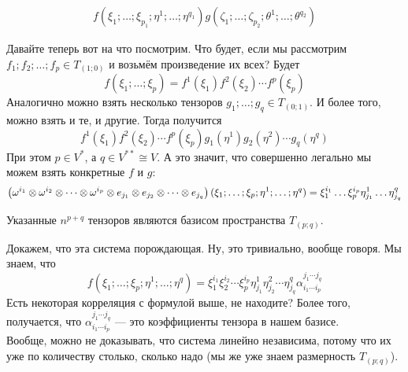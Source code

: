 \documentclass{article}
\begin{document}
\begin{itemize}
\begin{Comment}
\[\begin{split}
                f(\xi_1;\ldots;\xi_{p_1};\eta^1;\ldots;\eta^{q_1})g(\zeta_1;\ldots;\zeta_{p_2};\theta^1;\ldots;\theta^{q_2})
            \end{split}
            \]
        \end{Comment}
        \begin{Comment}
            Давайте теперь вот на что посмотрим. Что будет, если мы рассмотрим $f_1;f_2;\ldots;f_p\in T_{(1;0)}$ и возьмём произведение их всех? Будет
            $$
            f(\xi_1;\ldots;\xi_p)=f^1(\xi_1)f^2(\xi_2)\cdots f^p(\xi_p)
            $$
            Аналогично можно взять несколько тензоров $g_1;\ldots;g_q\in T_{(0;1)}$. И более того, можно взять и те, и другие. Тогда получится 
            $$
            f^1(\xi_1)f^2(\xi_2)\cdots f^p(\xi_p)g_1(\eta^1)g_2(\eta^2)\cdots g_q(\eta^q)
            $$
            При этом $p\in V^*$, а $q\in V^{**}\cong V$. А это значит, что совершенно легально мы можем взять конкретные $f$ и $g$:
            $$
            \left(\omega^{i_1}\otimes\omega^{i_2}\otimes\cdots\otimes\omega^{i_p}\otimes e_{j_1}\otimes e_{j_2}\otimes\cdots\otimes e_{j_q}\right)(\xi_1;\ldots;\xi_p;\eta^1;\ldots;\eta^q)=\\
            \xi_1^{i_1}\ldots\xi_p^{i_p}\eta^1_{j_1}\ldots\eta^q_{j_q}
            $$
        \end{Comment}
        \thm Указанные $n^{p+q}$ тензоров являются базисом пространства $T_{(p;q)}$.
        \begin{Proof}
            Докажем, что эта система порождающая. Ну, это тривиально, вообще говоря. Мы знаем, что
            $$
            f(\xi_1;\ldots;\xi_p;\eta^1;\ldots;\eta^q)=\xi_1^{i_1}\xi_2^{i_2}\cdots\xi_p^{i_p}\eta^1_{j_1}\eta^2_{j_2}\cdots\eta^q_{j_q}\alpha_{i_1\cdots i_p}^{j_1\cdots j_q}
            $$
            Есть некоторая корреляция с формулой выше, не находите? Более того, получается, что $\alpha_{i_1\cdots i_p}^{j_1\cdots j_q}$ --- это коэффициенты тензора в нашем базисе.\\
            Вообще, можно не доказывать, что система линейно независима, потому что их уже по количеству столько, сколько надо (мы же уже знаем размерность $T_{(p;q)}$).
        \end{Proof}
        \begin{Comment}

\end{Comment}
\end{itemize}
\end{document}
